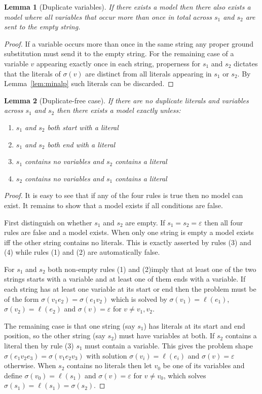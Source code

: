 \documentclass[a4paper, 12pt]{article}
\newtheorem{lemma}{Lemma}[section]
\begin{document}
\begin{lemma}[Duplicate variables]\label{lem:dupvars}
If there exists a model then there also exists a model where all variables that occur more than once in total across $s_1$ and $s_2$ are sent to the empty string.
\end{lemma}
\begin{proof}
If a variable occurs more than once in the same string any proper ground substitution must send it to the empty string. For the remaining case of a variable $v$ appearing exactly once in each string, properness for $s_1$ and $s_2$ dictates that the literals of $\sigma(v)$ are distinct from all literals appearing in $s_1$ or $s_2$. By Lemma~\ref{lem:minalp} such literals can be discarded.
\end{proof}

\begin{lemma}[Duplicate-free case]\label{lem:dupfree}
If there are no duplicate literals and variables across $s_1$ and $s_2$ then there exists a model exactly unless:
\begin{enumerate}
\item $s_1$ and $s_2$ both start with a literal
\item $s_1$ and $s_2$ both end with a literal
\item $s_1$ contains no variables and $s_2$ contains a literal
\item $s_2$ contains no variables and $s_1$ contains a literal
\end{enumerate}
\end{lemma}
\begin{proof}
It is easy to see that if any of the four rules is true then no model can exist. It remains to show that a model exists if all conditions are false.

First distinguish on whether $s_1$ and $s_2$ are empty. If $s_1 = s_2 = \varepsilon$ then all four rules are false and a model exists. When only one string is empty a model exists iff the other string contains no literals. This is exactly asserted by rules (3) and (4) while rules (1) and (2) are automatically false.

For $s_1$ and $s_2$ both non-empty rules (1) and (2)imply that at least one of the two strings starts with a variable and at least one of them ends with a variable. If each string has at least one variable at its start or end then the problem must be of the form $\sigma(v_1 e_2) = \sigma(e_1 v_2)$ which is solved by $\sigma(v_1) = \ell(e_1)$, $\sigma(v_2) = \ell(e_2)$ and $\sigma(v) = \varepsilon$ for $v \neq v_1,v_2$.

The remaining case is that one string (say $s_1$) has literals at its start and end position, so the other string (say $s_2$) must have variables at both. If $s_2$ contains a literal then by rule (3) $s_1$ must contain a variable. This gives the problem shape $\sigma(e_1 v_2 e_3) = \sigma(v_1 e_2 v_3)$ with solution $\sigma(v_i) = \ell(e_i)$ and $\sigma(v) = \varepsilon$ otherwise.
When $s_2$ contains no literals then let $v_0$ be one of its variables and define $\sigma(v_0) = \ell(s_1)$ and $\sigma(v) = \varepsilon$ for $v \neq v_0$, which solves $\sigma(s_1) = \ell(s_1) = \sigma(s_2)$.
\end{proof}
\end{document}
